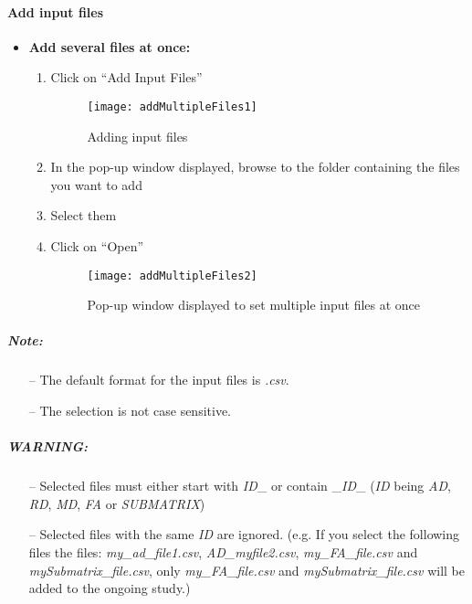 \documentclass[fadttsterUserGuide_use]{subfiles}
\begin{document}
	\paragraph{Add input files}
	\begin{itemize}
		\item \textbf{Add several files at once:}
		\begin{enumerate}
			\item Click on ``Add Input Files''
			\begin{figure}[H]
  				\texttt{[image: addMultipleFiles1]}
  				\caption{Adding input files}
    			\label{fig:addInputFiles_pushButton}
			\end{figure}
			\item In the pop-up window displayed, browse to the folder containing the files you want to add
			\item Select them
			\item Click on ``Open''
			\begin{figure}[H]
  				\texttt{[image: addMultipleFiles2]}
  				\caption{Pop-up window displayed to set multiple input files at once}
    			\label{fig:addMultipleInputFiles_popUp}
			\end{figure}
		\end{enumerate}
	\end{itemize}
	\subparagraph{\textbf{Note:}}
	\begin{itemize}
		\item[--] The default format for the input files is \textit{.csv}.
		\item[--] The selection is not case sensitive.
	\end{itemize}	 
	\subparagraph{\textbf{WARNING:}}
	\begin{itemize}
		\item[--] Selected files must either start with \textit{ID}\_ or contain \_\textit{ID}\_
			\newline
			(\textit{ID} being \textit{AD}, \textit{RD}, \textit{MD}, \textit{FA} or \textit{SUBMATRIX})
			\vfill
			\newpage	
			
		\item[--] Selected files with the same \textit{ID} are ignored.
			\newline
			(e.g. If you select the following files the files: \textit{my\_ad\_file1.csv}, \textit{AD\_myfile2.csv}, \textit{my\_FA\_file.csv} and \textit{mySubmatrix\_file.csv}, only \textit{my\_FA\_file.csv} and \textit{mySubmatrix\_file.csv} will be added to the ongoing study.)
	\end{itemize}
\end{document}

